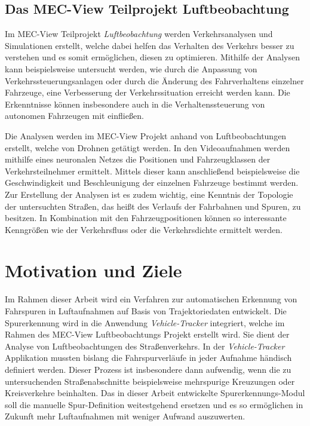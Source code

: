 \subsection{Das MEC-View Teilprojekt Luftbeobachtung}
\label{sec:mecview_sim}

Im MEC-View Teilprojekt \textit{Luftbeobachtung} werden Verkehrsanalysen und Simulationen erstellt, welche dabei helfen
das Verhalten des Verkehrs besser zu verstehen und es somit ermöglichen, diesen zu optimieren.
Mithilfe der Analysen kann beispielsweise untersucht werden, wie durch die Anpassung von Verkehrssteuerungsanlagen
oder durch die Änderung des Fahrverhaltens einzelner Fahrzeuge, eine Verbesserung der Verkehrssituation erreicht werden kann.
Die Erkenntnisse können insbesondere auch in die Verhaltenssteuerung von autonomen Fahrzeugen mit einfließen.

Die Analysen werden im MEC-View Projekt anhand von Luftbeobachtungen erstellt, welche von Drohnen getätigt werden.
In den Videoaufnahmen werden mithilfe eines neuronalen Netzes die Positionen und Fahrzeugklassen der Verkehrsteilnehmer ermittelt.
Mittels dieser kann anschließend beispielsweise die Geschwindigkeit und Beschleunigung der einzelnen Fahrzeuge bestimmt werden.
Zur Erstellung der Analysen ist es zudem wichtig, eine Kenntnis der Topologie der untersuchten Straßen, das heißt des
Verlaufs der Fahrbahnen und Spuren, zu besitzen. In Kombination mit den Fahrzeugpositionen können so interessante
Kenngrößen wie der Verkehrsfluss oder die Verkehrsdichte ermittelt werden.

\section{Motivation und Ziele}
\label{sec:motivation_goals}

Im Rahmen dieser Arbeit wird ein Verfahren zur automatischen Erkennung von Fahrspuren in Luftaufnahmen
auf Basis von Trajektoriedaten entwickelt. Die Spurerkennung wird in die Anwendung \textit{Vehicle-Tracker}
integriert, welche im Rahmen des MEC-View Luftbeobachtungs Projekt erstellt wird. Sie dient der Analyse
von Luftbeobachtungen des Straßenverkehrs.
In der \textit{Vehicle-Tracker} Applikation mussten bislang die Fahrspurverläufe in jeder Aufnahme
händisch definiert werden. Dieser Prozess ist insbesondere dann aufwendig, wenn die zu untersuchenden
Straßenabschnitte beispielsweise mehrspurige Kreuzungen oder Kreisverkehre beinhalten. Das in dieser Arbeit
entwickelte Spurerkennungs-Modul soll die manuelle Spur-Definition weitestgehend ersetzen und es so ermöglichen
in Zukunft mehr Luftaufnahmen mit weniger Aufwand auszuwerten.

